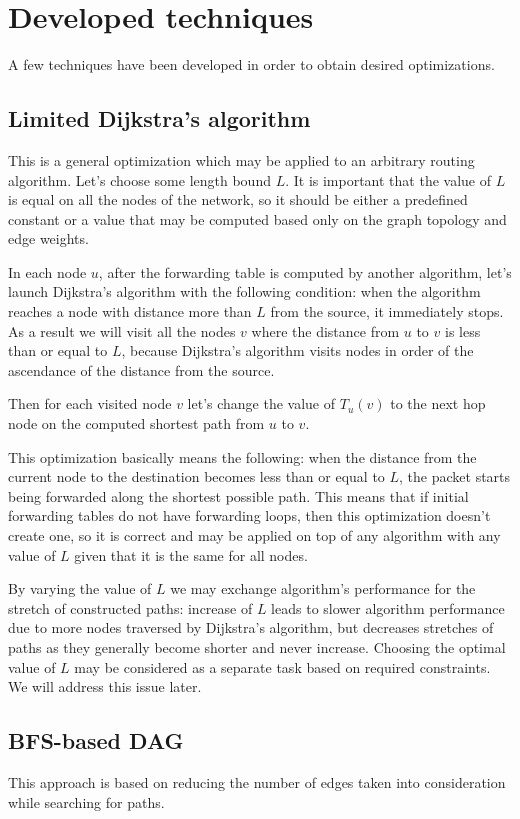 \section{Developed techniques}

A few techniques have been developed in order to obtain desired optimizations.

\subsection{Limited Dijkstra's algorithm}
\label{sec:ld}
This is a general optimization which may be applied to an arbitrary routing algorithm. Let's choose some length bound $L$. It is important that the value of $L$ is equal on all the nodes of the network, so it should be either a predefined constant or a value that may be computed based only on the graph topology and edge weights.

In each node $u$, after the forwarding table is computed by another algorithm, let's launch Dijkstra's algorithm with the following condition: when the algorithm reaches a node with distance more than $L$ from the source, it immediately stops. As a result we will visit all the nodes $v$ where the distance from $u$ to $v$ is less than or equal to $L$, because Dijkstra's algorithm visits nodes in order of the ascendance of the distance from the source.

Then for each visited node $v$ let's change the value of $T_u(v)$ to the next hop node on the computed shortest path from $u$ to $v$.

This optimization basically means the following: when the distance from the current node to the destination becomes less than or equal to $L$, the packet starts being forwarded along the shortest possible path. This means that if initial forwarding tables do not have forwarding loops, then this optimization doesn't create one, so it is correct and may be applied on top of any algorithm with any value of $L$ given that it is the same for all nodes.

By varying the value of $L$ we may exchange algorithm's performance for the stretch of constructed paths: increase of $L$ leads to slower algorithm performance due to more nodes traversed by Dijkstra's algorithm, but decreases stretches of paths as they generally become shorter and never increase.
Choosing the optimal value of $L$ may be considered as a separate task based on required constraints. We will address this issue later.

\subsection{BFS-based DAG}
\label{sec:bfs-dag}
This approach is based on reducing the number of edges taken into consideration while searching for paths.

